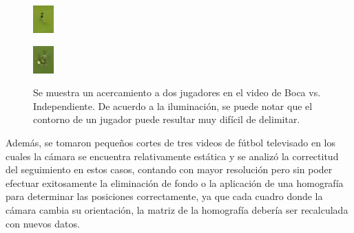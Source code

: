 \begin{figure}[H]
    \centering
    \begin{minipage}[t]{.5\textwidth}
        \centering
        \includegraphics[width=.4\linewidth]{./images/boca-dificil1.png}
        \label{fig:boca-dificil1}
    \end{minipage}%
    \begin{minipage}[t]{.5\textwidth}
        \centering
        \includegraphics[width=.4\linewidth]{./images/boca-dificil2.png}
        \label{fig:boca-difícil2}
    \end{minipage}
    \caption{Se muestra un acercamiento a dos jugadores en el video de Boca vs.
             Independiente. De acuerdo a la iluminación, se puede notar que el
             contorno de un jugador puede resultar muy difícil de delimitar.}

\end{figure}

Además, se tomaron pequeños cortes de tres videos de fútbol televisado en los
cuales la cámara se encuentra relativamente estática y se analizó la
correctitud del seguimiento en estos casos, contando con mayor resolución pero
sin poder efectuar exitosamente la eliminación de fondo o la aplicación de una
homografía para determinar las posiciones correctamente, ya que cada cuadro
donde la cámara cambia su orientación, la matriz de la homografía debería ser
recalculada con nuevos datos.

